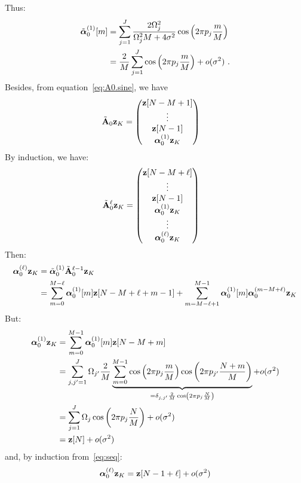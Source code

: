 Thus:
\begin{align*}
\tilde{\boldsymbol{\alpha}}_0^{(1)}[m]  &=\sum_{j=1}^J\dfrac{2\Omega_j^2}{\Omega_j^2M+4\sigma^2}\cos\left(2\pi p_j\frac{m}{M}\right) \\
&= \dfrac{2}{M}\sum_{j=1}^J\cos\left(2\pi p_j\frac{m}{M}\right) + o(\sigma^2)\ .
\end{align*}
Besides, from equation~\eqref{eq:A0.sine}, we have
\begin{align*}
\tilde{{\mathbf A}}_0{\mathbf z}_{K} &= 
\begin{pmatrix}
{\mathbf z}[N-M+1] \\
\vdots \\
{\mathbf z}[N-1] \\
\boldsymbol{\alpha}_0^{(1)}{\mathbf z}_K
\end{pmatrix}
\end{align*}
By induction, we have:
\begin{align*}
\tilde{{\mathbf A}}_0^{\ell}{\mathbf z}_{K} &= 
\begin{pmatrix}
{\mathbf z}[N-M+\ell] \\
\vdots \\
{\mathbf z}[N-1] \\
\boldsymbol{\alpha}_0^{(1)}{\mathbf z}_K \\
\vdots \\
\boldsymbol{\alpha}_0^{(\ell)}{\mathbf z}_K
\end{pmatrix}
\end{align*}
Then:
\begin{align}
\nonumber
\boldsymbol{\alpha}_0^{(\ell)}{\mathbf z}_{K} &= \tilde{\boldsymbol{\alpha}}_0^{(1)}\tilde{{\mathbf A}}_0^{\ell-1}{\mathbf z}_{K} \\
&=\sum_{m=0}^{M-\ell}\boldsymbol{\alpha}_0^{(1)}[m]{\mathbf z}[N-M+\ell+m-1]+\sum_{m=M-\ell+1}^{M-1}\boldsymbol{\alpha}_0^{(1)}[m]\boldsymbol{\alpha}_0^{(m-M+\ell)}{\mathbf z}_K
\label{eq:seq}
\end{align}
But:
\begin{align*}
\boldsymbol{\alpha}_0^{(1)}{\mathbf z}_{K} &=\sum_{m=0}^{M-1}\boldsymbol{\alpha}_0^{(1)}[m]{\mathbf z}[N-M+m] \\
&=\sum_{j,j'=1}^J\Omega_{j'}\dfrac{2}{M}\underbrace{\sum_{m=0}^{M-1}\cos\left(2\pi p_j\frac{m}{M}\right)\cos\left(2\pi p_{j'}\dfrac{N+m}{M}\right)}_{=\delta_{j,j'}\frac2M\cos\left(2\pi p_j\frac{N}M\right)} + o(\sigma^2) \\
&= \sum_{j=1}^J\Omega_j\cos\left(2\pi p_j\dfrac{N}{M}\right) + o(\sigma^2) \\
&= {\mathbf z}[N] + o(\sigma^2)
\end{align*}
and, by induction from~\eqref{eq:seq}:
\begin{equation}
\label{eq:alpha0z.sine}
\boldsymbol{\alpha}_0^{(\ell)}{\mathbf z}_{K} = {\mathbf z}[N-1+\ell] + o(\sigma^2)
\end{equation}


